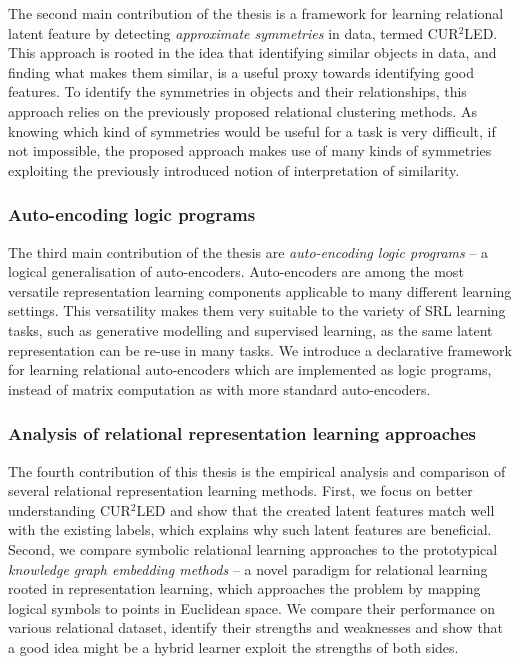 The second main contribution of the thesis is a framework for learning relational latent feature by detecting \textit{approximate symmetries} in data, termed CUR$^2$LED.
This approach is rooted in the idea that identifying similar objects in data, and finding what makes them similar, is a useful proxy towards identifying good features.
To identify the symmetries in objects and their relationships, this approach relies on the previously proposed relational clustering methods.
As knowing which kind of symmetries would be useful for a task is very difficult, if not impossible, the proposed approach makes use of many kinds of symmetries exploiting the previously introduced notion of interpretation of similarity.
 






\subsubsection{Auto-encoding logic programs}

The third main contribution of the thesis are \textit{auto-encoding logic programs} -- a logical generalisation of auto-encoders.
Auto-encoders are among the most versatile representation learning components applicable to many different learning settings.
This versatility makes them very suitable to the variety of SRL learning tasks, such as generative modelling and supervised learning, as the same latent representation can be re-use in many tasks.
We introduce a declarative framework for learning relational auto-encoders which are implemented as logic programs, instead of matrix computation as with more standard auto-encoders.






\subsubsection{Analysis of relational representation learning approaches}

The fourth contribution of this thesis is the empirical analysis and comparison of several relational representation learning methods.
First, we focus on better understanding CUR$^2$LED and show that the created latent features match well with the existing labels, which explains why such latent features are beneficial.
Second, we compare symbolic relational learning approaches to the prototypical \textit{knowledge graph embedding methods} -- a novel paradigm for relational learning rooted in representation learning, which approaches the problem by mapping logical symbols to points in Euclidean space.
We compare their performance on various relational dataset, identify their strengths and weaknesses and show that a good idea might be a hybrid learner exploit the strengths of both sides.




